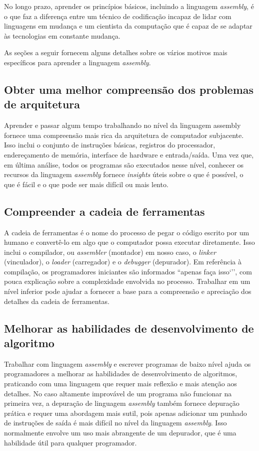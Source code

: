 No longo prazo, aprender os princípios básicos, incluindo a linguagem \textit{assembly}, é o que faz a diferença entre um técnico de codificação incapaz de lidar com linguagens em mudança e um cientista da computação que é capaz de se adaptar às tecnologias em constante mudança.

As seções a seguir fornecem alguns detalhes sobre os vários motivos mais específicos para aprender a linguagem \textit{assembly}.

\subsection{Obter uma melhor compreensão dos problemas de arquitetura}
Aprender e passar algum tempo trabalhando no nível da linguagem assembly fornece uma compreensão mais rica da arquitetura de computador subjacente. Isso inclui o conjunto de instruções básicas, registros do processador, endereçamento de memória, interface de hardware e entrada/saída. Uma vez que, em última análise, todos os programas são executados nesse nível, conhecer os recursos da linguagem \textit{assembly} fornece \textit{insights} úteis sobre o que é possível, o que é fácil e o que pode ser mais difícil ou mais lento.

\subsection{Compreender a cadeia de ferramentas}
A cadeia de ferramentas é o nome do processo de pegar o código escrito por um humano e convertê-lo em algo que o computador possa executar diretamente. Isso inclui o compilador, ou \textit{assembler} (montador) em nosso caso, o \textit{linker} (vinculador), o \textit{loader} (carregador) e o \textit{debugger} (depurador). Em referência à compilação, os programadores iniciantes são informados ``apenas faça isso`'', com pouca explicação sobre a complexidade envolvida no processo. Trabalhar em um nível inferior pode ajudar a fornecer a base para a compreensão e apreciação dos detalhes da cadeia de ferramentas.

\subsection{Melhorar as habilidades de desenvolvimento de algoritmo}
Trabalhar com linguagem \textit{assembly} e escrever programas de baixo nível ajuda os programadores a melhorar as habilidades de desenvolvimento de algoritmos, praticando com uma linguagem que requer mais reflexão e mais atenção aos detalhes. No caso altamente improvável de um programa não funcionar na primeira vez, a depuração de linguagem \textit{assembly} também fornece depuração prática e requer uma abordagem mais sutil, pois apenas adicionar um punhado de instruções de saída é mais difícil no nível da linguagem \textit{assembly}. Isso normalmente envolve um uso mais abrangente de um depurador, que é uma habilidade útil para qualquer programador.

